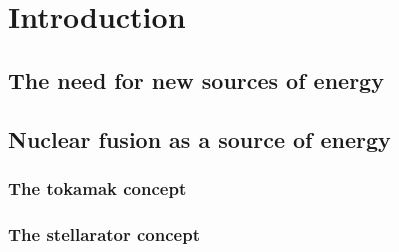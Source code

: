 \cleardoublepage
\chapter*{Introduction}

\section{The need for new sources of energy}



\section{Nuclear fusion as a source of energy}

\subsection{The tokamak concept}

\subsection{The stellarator concept}




